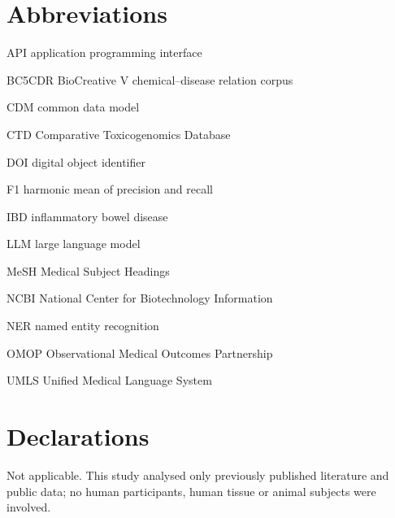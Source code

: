 \documentclass[referee,lineno,pdflatex,sn-vancouver-num]{sn-jnl}
\theoremstyle{thmstyleone}%
\theoremstyle{thmstyletwo}%
\theoremstyle{thmstylethree}%
\begin{document}
\section*{Abbreviations}
\begin{list}{}{%
  \setlength{\labelwidth}{6.5em}%
  \setlength{\labelsep}{0.5em}%
  \setlength{\leftmargin}{7em}%
  \setlength{\itemsep}{0pt}%
  \setlength{\parsep}{0pt}%
  \setlength{\topsep}{2pt}%
  \renewcommand{\makelabel}[1]{\textbf{#1}\hfill}}
\item[API] application programming interface
\item[BC5CDR] BioCreative V chemical--disease relation corpus
\item[CDM] common data model
\item[CTD] Comparative Toxicogenomics Database
\item[DOI] digital object identifier
\item[F1] harmonic mean of precision and recall
\item[IBD] inflammatory bowel disease
\item[LLM] large language model
\item[MeSH] Medical Subject Headings
\item[NCBI] National Center for Biotechnology Information
\item[NER] named entity recognition
\item[OMOP] Observational Medical Outcomes Partnership
\item[UMLS] Unified Medical Language System
\end{list}

\section*{Declarations}

Not applicable. This study analysed only previously published literature and
public data; no human participants, human tissue or animal subjects were
involved.
\end{document}
